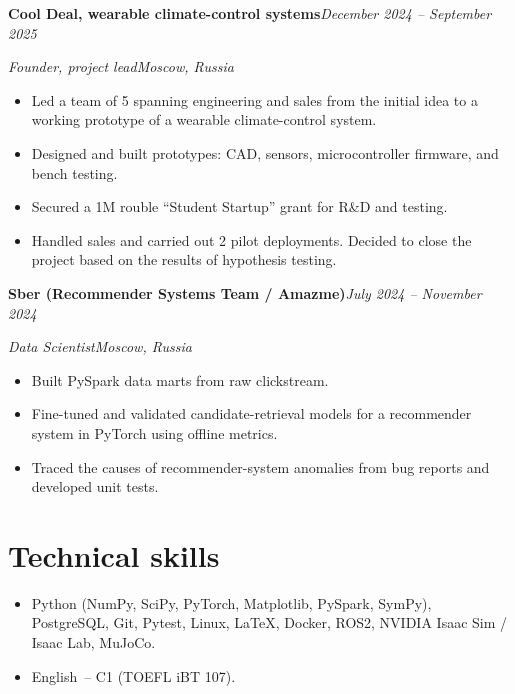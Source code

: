 \documentclass[10pt,a4paper]{article}
\newcommand{\entry}[4]{%
  \par\noindent\textbf{#1}\hfill\textit{#2}\par
  \noindent\textit{#3}\hfill\textit{#4}\par\vspace{2pt}}
\newcommand{\entrygap}{\par\vspace{0.5cm}}
\begin{document}
\entry{Cool Deal, wearable climate-control systems}{December 2024 -- September 2025}{Founder, project lead}{Moscow, Russia}
\begin{itemize}[leftmargin=*,nosep]
\item Led a team of 5 spanning engineering and sales from the initial idea to a working prototype of a wearable climate-control system.
\item Designed and built prototypes: CAD, sensors, microcontroller firmware, and bench testing.
\item Secured a 1M rouble ``Student Startup'' grant for R\&D and testing.
\item Handled sales and carried out 2 pilot deployments. Decided to close the project based on the results of hypothesis testing.
\end{itemize}
\entrygap

\entry{Sber (Recommender Systems Team / Amazme)}{July 2024 -- November 2024}{Data Scientist}{Moscow, Russia}
\begin{itemize}[leftmargin=*,nosep]
\item Built PySpark data marts from raw clickstream.
\item Fine-tuned and validated candidate-retrieval models for a recommender system in PyTorch using offline metrics.
\item Traced the causes of recommender-system anomalies from bug reports and developed unit tests.
\end{itemize}
\vspace{0.2cm}

\section*{Technical skills}
\begin{itemize}[leftmargin=*,nosep]
\item Python (NumPy, SciPy, PyTorch, Matplotlib, PySpark, SymPy), PostgreSQL, Git, Pytest, Linux, \LaTeX, Docker, ROS2, NVIDIA Isaac Sim / Isaac Lab, MuJoCo.
\item English~-- C1 (TOEFL iBT 107).
\end{itemize}
\end{document}
